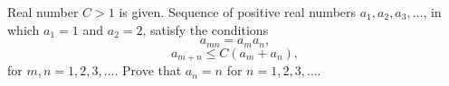 Real number $C > 1$ is given. Sequence of positive real numbers $a_1, a_2, a_3, \ldots$, in which $a_1=1$ and $a_2=2$, satisfy the conditions
\[a_{mn}=a_ma_n, \] \[a_{m+n} \leq C(a_m + a_n),\]
for $m, n = 1, 2, 3, \ldots$. Prove that $a_n = n$ for $n=1, 2, 3, \ldots$.